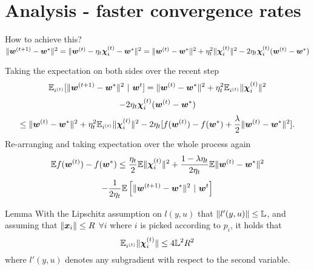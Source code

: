 
\section{Analysis - faster convergence rates}
\begin{frame}{How to achieve this?}
$\|\bm{w}^{(t+1)}-\bm{w}^*\|^2 = \|\bm{w}^{(t)} - \eta_t\bm{\chi}_i^{(t)} - \bm{w}^*\|^2
    = \|\bm{w}^{(t)} - \bm{w}^*\|^2 + \eta_t^2\|\bm{\chi}_i^{(t)}\|^2 - 2\eta_t\bm{\chi}_i^{(t)}(\bm{w}^{(t)} - \bm{w}^*    )$


Taking the expectation on both sides over the recent step
\[
    \E_{i^{(t)}}[ \|\wv^{(t+1)}-\wv^*\|^2  \ |\  \wv^t ] 
        = \|\wv^{(t)} - \wv^*\|^2 + \eta_t^2\E_{i^{(t)}}\|\chiv_i^{(t)}\|^2 
\]
\[
    - 2\eta_t\bm{\chi}_i^{(t)}(\bm{w}^{(t)} - \bm{w}^*)
\]
\[
    \le \|\bm{w}^{(t)} - \bm{w}^*\|^2 + \eta_t^2\mathbb{E}_{i^{(t)}}\|\bm{\chi}_i^{(t)}\|^2 - 2\eta_t[f(\bm{w}^{(t)}) -      f(\bm{w}^*) + \frac{\lambda}{2}\|\bm{w}^{(t)}-\bm{w}^*\|^2].
\]
Re-arranging and taking expectation over the whole process again
\[
    \mathbb{E} f(\bm{w}^{(t)})-f(\bm{w}^*) \le \frac{\eta_t}{2}\mathbb{E}\|\bm{\chi}_i^{(t)}\|^2+\frac{1-\lambda     \eta_t}{2\eta_t} \mathbb{E} \|\bm{w}^{(t)}-\bm{w}^*\|^2 
\]
\[
    - \frac{1}{2\eta_t}\E\left[  \|\wv^{(t+1)} - \wv^*\|^2  \ |\        \wv^t  \right] 
\]
\end{frame}

\begin{frame}{Lemma}
With the Lipschitz assumption on $l(y,u)$ that $\|l'(y,u)\| \le \mathbb{L}$, and assuming that $\|\bm{x}_i\|\le     R$ $\forall i$ where $i$ is picked according to $p_i$, it holds that
\[
    \mathbb{E}_{i^{(t)}} \|\bm{\chi}_i^{(t)}\|\le 4\mathbb{L}^2R^2
\]
where $l'(y,u)$ denotes any subgradient with respect to the second variable.

\end{frame}

